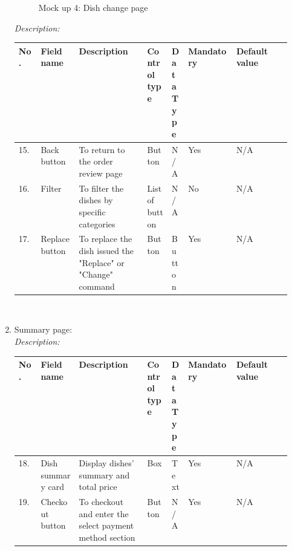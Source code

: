 \documentclass[a4paper,11pt]{extarticle}
\begin{document}
\begin{enumerate}[wide=0pt]
\begin{figure}[htbp]
{
            }%
            \caption{Mock up 4: Dish change page}
            \label{fig:changing}
        \end{figure}
        \newpage
    \emph{Description:}  \\
    \begin{tabularx}{\textwidth}{|l|p{0.14\linewidth}|p{0.25\linewidth}|p{0.09\linewidth}|p{0.065\linewidth}|l|X|}
        \hline
        \textbf{No.} & \textbf{Field name} & \textbf{Description} & \textbf{Control type} & \textbf{Data Type} & \textbf{Mandatory} & \textbf{Default value} \\
        \hline
        15. & Back button & To return to the order review page & Button & N/A & Yes & N/A \\
        \hline
        16. & Filter & To filter the dishes by specific categories & List of button & N/A & No & N/A \\ 
        \hline
        17. & Replace button & To replace the dish issued the "Replace" or "Change" command & Button & Button & Yes & N/A \\ 
        \hline
    \end{tabularx} \\
   \item Summary page: \\
    \emph{Description:}  \\
    \begin{tabularx}{\textwidth}{|l|p{0.14\linewidth}|p{0.25\linewidth}|p{0.09\linewidth}|p{0.065\linewidth}|l|X|}
        \hline
        \textbf{No.} & \textbf{Field name} & \textbf{Description} & \textbf{Control type} & \textbf{Data Type} & \textbf{Mandatory} & \textbf{Default value} \\
        \hline
        18. & Dish summary card & Display dishes' summary and total price & Box & Text & Yes & N/A \\
        \hline
        19. & Checkout button & To checkout and enter the select payment method section & Button & N/A & Yes & N/A \\ 
        \hline
    \end{tabularx}
    

\end{enumerate}
\end{document}
